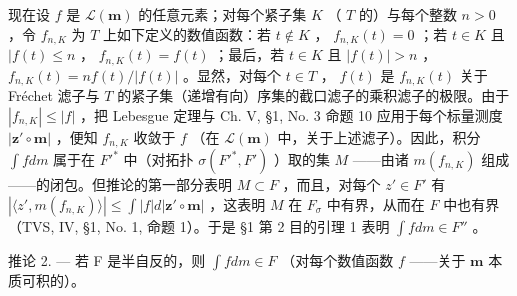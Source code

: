 现在设 \(f\) 是 \(\mathcal{L}(\mathbf{m})\) 的任意元素；对每个紧子集 \(K\) （ \(T\) 的）与每个整数 \(n > 0\) ，令 \(f_{n,K}\) 为 \(T\) 上如下定义的数值函数：若 \(t \notin K\) ， \(f_{n,K}(t) = 0\) ；若 \(t \in K\) 且 \(|f(t) \leqslant n\) ， \(f_{n,K}(t) = f(t)\) ；最后，若 \(t \in K\) 且 \(|f(t)| > n\) ， \(f_{n,K}(t) = nf(t)/|f(t)|\) 。显然，对每个 \(t \in T\) ， \(f(t)\) 是 \(f_{n,K}(t)\) 关于 Fréchet 滤子与 \(T\) 的紧子集（递增有向）序集的截口滤子的乘积滤子的极限。由于 \(|f_{n,K}| \leqslant |f|\) ，把 Lebesgue 定理与 Ch. V, §1, No. 3 命题 10 应用于每个标量测度 \(|\mathbf{z}' \circ \mathbf{m}|\) ，便知 \(f_{n,K}\) 收敛于 \(f\) （在 \(\mathcal{L}(\mathbf{m})\) 中，关于上述滤子）。因此，积分 \(\int f dm\) 属于在 \(F'^*\) 中（对拓扑 \(\sigma(F'^*, F')\) ）取的集 \(M\) ——由诸 \(m(f_{n,K})\) 组成——的闭包。但推论的第一部分表明 \(M \subset F\) ，而且，对每个 \(z' \in F'\) 有 \(|\langle z', m(f_{n,K})\rangle| \leqslant \int |f| d|\mathbf{z}' \circ \mathbf{m}|\) ，这表明 \(M\) 在 \(F_\sigma\) 中有界，从而在 \(F\) 中也有界（TVS, IV, §1, No. 1, 命题 1）。于是 §1 第 2 目的引理 1 表明 \(\int f dm \in F''\) 。

推论 2. --- 若 F 是半自反的，则 \(\int f dm \in F\) （对每个数值函数 \(f\) ——关于 \(\mathbf{m}\) 本质可积的）。

